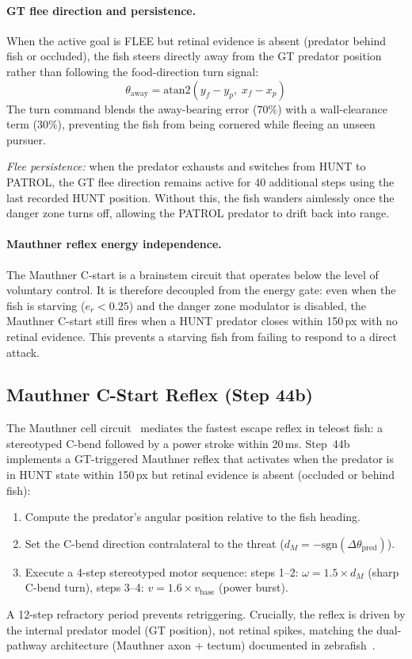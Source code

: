 \documentclass[11pt,a4paper]{article}
\begin{document}
\paragraph{GT flee direction and persistence.}
When the active goal is FLEE but retinal evidence is absent (predator
behind fish or occluded), the fish steers directly away from the GT
predator position rather than following the food-direction turn signal:
\begin{equation}
  \theta_{\text{away}} = \mathrm{atan2}(y_f - y_p,\; x_f - x_p)
\end{equation}
The turn command blends the away-bearing error ($70\%$) with a
wall-clearance term ($30\%$), preventing the fish from being cornered
while fleeing an unseen pursuer.

\textit{Flee persistence:} when the predator exhausts and switches from
HUNT to PATROL, the GT flee direction remains active for 40 additional
steps using the last recorded HUNT position.  Without this, the fish
wanders aimlessly once the danger zone turns off, allowing the PATROL
predator to drift back into range.

\paragraph{Mauthner reflex energy independence.}
The Mauthner C-start is a brainstem circuit that operates below the level
of voluntary control.  It is therefore decoupled from the energy gate:
even when the fish is starving ($e_r < 0.25$) and the danger zone
modulator is disabled, the Mauthner C-start still fires when a HUNT
predator closes within 150\,px with no retinal evidence.  This prevents
a starving fish from failing to respond to a direct attack.

\subsection{Mauthner C-Start Reflex (Step 44b)}\label{sec:mauthner}

The Mauthner cell circuit~\cite{bhatt2009,weiss2006} mediates the fastest
escape reflex in teleost fish: a stereotyped C-bend followed by a power stroke
within 20\,ms.  Step~44b implements a GT-triggered Mauthner reflex that
activates when the predator is in HUNT state within 150\,px but retinal
evidence is absent (occluded or behind fish):

\begin{enumerate}
  \item Compute the predator's angular position relative to the fish heading.
  \item Set the C-bend direction contralateral to the threat
    ($d_M = -\mathrm{sgn}(\Delta\theta_{\text{pred}})$).
  \item Execute a 4-step stereotyped motor sequence:
    steps 1--2: $\omega = 1.5 \times d_M$ (sharp C-bend turn),
    steps 3--4: $v = 1.6\times v_{\text{base}}$ (power burst).
\end{enumerate}
A 12-step refractory period prevents retriggering.  Crucially, the reflex is
driven by the internal predator model (GT position), not retinal spikes,
matching the dual-pathway architecture (Mauthner axon + tectum) documented
in zebrafish~\cite{orger2008}.
\end{document}
